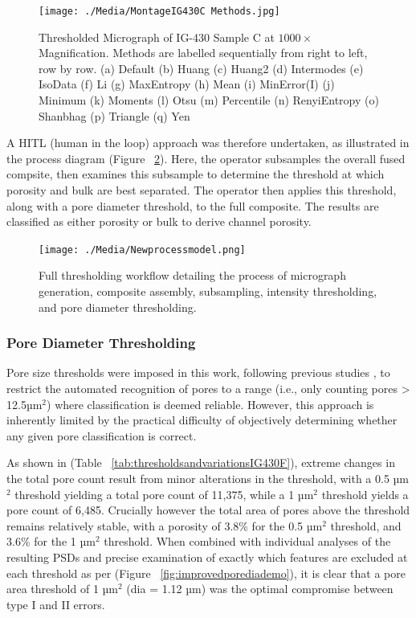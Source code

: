 \documentclass[3p,twocolumn]{elsarticle}
\begin{document}
	\begin{figure}[!htbp]
		\centering
		\texttt{[image: ./Media/MontageIG430C Methods.jpg]}
		\caption{Thresholded Micrograph of IG-430 Sample C at $1000\times$ Magnification. Methods are labelled sequentially from right to left, row by row. (a) Default
			(b) Huang
			(c) Huang2
			(d) Intermodes
			(e) IsoData
			(f) Li
			(g) MaxEntropy
			(h) Mean
			(i) MinError(I)
			(j) Minimum
			(k) Moments
			(l) Otsu
			(m) Percentile
			(n) RenyiEntropy
			(o) Shanbhag
			(p) Triangle
			(q) Yen}
		\label{fig:Try All Thresholding Methods}
	\end{figure}  

	A HITL (human in the loop) approach was therefore undertaken, as illustrated
	in the  process diagram (Figure ~\ref{fig:Final Workflow}). Here, the operator
	subsamples the overall fused compsite, then examines this subsample to
	determine the threshold at which porosity and bulk are best separated. The
	operator then applies this threshold, along with a pore diameter threshold, to
	the full composite. The results are classified as either porosity or bulk to
	derive channel porosity.
	
\begin{figure}[!htbp]
    \centering
    \texttt{[image: ./Media/Newprocessmodel.png]}
    \caption{Full thresholding workflow detailing the process of micrograph generation,
     composite assembly, subsampling, intensity thresholding, and pore diameter thresholding.}
    \label{fig:Final Workflow}
\end{figure}

	\subsubsection{Pore Diameter Thresholding}
    
  Pore size thresholds were imposed in this work, following previous studies
  \citep{Taylor2016, Huang2019, Kane2011a}, to restrict the automated
  recognition of pores to a range (i.e., only counting pores > 12.5µm\(^2\))
  where classification is deemed reliable. However, this approach is inherently
  limited by the practical difficulty of objectively determining whether any
  given pore classification is correct.
      
  As shown in (Table ~\ref{tab:thresholdsandvariationsIG430F}), extreme changes
  in the total pore count result from minor alterations in the threshold, with a
  0.5 µm\(^2\) threshold yielding a total pore count of 11,375, while a 1
  µm\(^2\) threshold yields a pore count of 6,485. Crucially however the total
  area of pores above the threshold remains relatively stable, with a porosity
  of 3.8\% for the 0.5 µm\(^2\) threshold, and 3.6\% for the 1 µm\(^2\)
  threshold. When combined with individual analyses of the resulting PSDs and
  precise examination of exactly which features are excluded at each
  threshold as per (Figure ~\ref{fig:improvedporediademo}), it is clear that a
  pore area threshold of 1 µm\(^2\) (dia = 1.12 µm) was the optimal compromise
  between type I and II errors.
\end{document}
